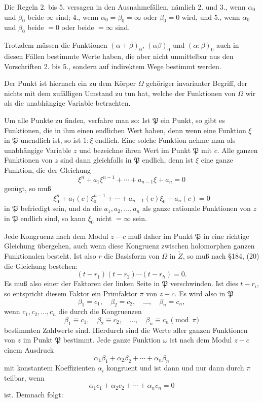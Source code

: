 \documentclass[12pt,a4paper]{article}
\theoremstyle{definition}
\begin{document}
Die Regeln 2. bis 5. versagen in den Ausnahmefällen, nämlich 2. und 3., wenn $\alpha_0$ und $\beta_0$ beide $\infty$ sind; 4., wenn $\alpha_0 = \beta_0 = \infty$ oder $\beta_0 = 0$ wird, und 5., wenn $\alpha_0$ und $\beta_0$ beide $= 0$ oder beide $= \infty$ sind.

Trotzdem müssen die Funktionen $(\alpha + \beta)_0$, $(\alpha\beta)_0$ und $(\alpha:\beta)_0$ auch in diesen Fällen bestimmte Werte haben, die aber nicht unmittelbar aus den Vorschriften 2. bis 5., sondern auf indirektem Wege bestimmt werden.

Der Punkt ist hiernach ein zu dem Körper $\Omega$ gehöriger invarianter Begriff, der nichts mit dem zufälligen Umstand zu tun hat, welche der Funktionen von $\Omega$ wir als die unabhängige Variable betrachten.

Um alle Punkte zu finden, verfahre man so: Ist $\mathfrak{P}$ ein Punkt, so gibt es Funktionen, die in ihm einen endlichen Wert haben, denn wenn eine Funktion $\xi$ in $\mathfrak{P}$ unendlich ist, so ist $1:\xi$ endlich. Eine solche Funktion nehme man als unabhängige Variable $z$ und bezeichne ihren Wert im Punkt $\mathfrak{P}$ mit $c$. Alle ganzen Funktionen von $z$ sind dann gleichfalls in $\mathfrak{P}$ endlich, denn ist $\xi$ eine ganze Funktion, die der Gleichung
\[\xi^n + a_1\xi^{n-1} + \cdots + a_{n-1}\xi + a_n = 0\]
genügt, so muß
\[\xi_0^n + a_1(c)\xi_0^{n-1} + \cdots + a_{n-1}(c)\xi_0 + a_n(c) = 0\]
in $\mathfrak{P}$ befriedigt sein, und da die $a_1, a_2, \ldots, a_n$ als ganze rationale Funktionen von $z$ in $\mathfrak{P}$ endlich sind, so kann $\xi_0$ nicht $= \infty$ sein.

Jede Kongruenz nach dem Modul $z - c$ muß daher im Punkt $\mathfrak{P}$ in eine richtige Gleichung übergehen, auch wenn diese Kongruenz zwischen holomorphen ganzen Funktionalen besteht. Ist also $r$ die Basisform von $\Omega$ in $\tilde{Z}$, so muß nach \S 184, (20) die Gleichung bestehen:
\[(t - r_1)(t - r_2)\cdots(t - r_h) = 0.\]
Es muß also einer der Faktoren der linken Seite in $\mathfrak{P}$ verschwinden. Ist dies $t - r_i$, so entspricht diesem Faktor ein Primfaktor $\pi$ von $z - c$. Es wird also in $\mathfrak{P}$
\begin{equation}
\beta_1 = c_1, \quad \beta_2 = c_2, \quad \ldots, \quad \beta_n = c_n,
\end{equation}
wenn $c_1, c_2, \ldots, c_n$ die durch die Kongruenzen
\begin{equation}
\beta_1 \equiv c_1, \quad \beta_2 \equiv c_2, \quad \ldots, \quad \beta_n \equiv c_n \pmod{\pi}
\end{equation}
bestimmten Zahlwerte sind. Hierdurch sind die Werte aller ganzen Funktionen von $z$ im Punkt $\mathfrak{P}$ bestimmt. Jede ganze Funktion $\omega$ ist nach dem Modul $z - c$ einem Ausdruck
\[\alpha_1\beta_1 + \alpha_2\beta_2 + \cdots + \alpha_n\beta_n\]
mit konstantem Koeffizienten $\alpha_i$ kongruent und ist dann und nur dann durch $\pi$ teilbar, wenn
\[\alpha_1c_1 + \alpha_2c_2 + \cdots + \alpha_nc_n = 0\]
ist. Demnach folgt:
\end{document}
